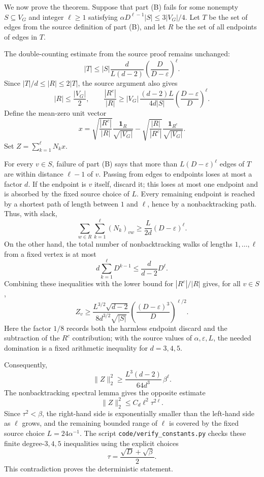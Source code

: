 \documentclass[11pt]{article}
\begin{document}
We now prove the theorem.  Suppose that part (B) fails for some nonempty
$S\subseteq V_G$ and integer $\ell\ge1$ satisfying
$\alpha D^{\ell-1}|S|\le 3|V_G|/4$.  Let $T$ be the set of edges from the
source definition of part (B), and let $R$ be the set of all endpoints of
edges in $T$.

The double-counting estimate from the source proof remains unchanged:
\[
  |T|\le |S|\frac{d}{L(d-2)}
  \left(\frac{D}{D-\varepsilon}\right)^\ell .
\]
Since $|T|/d\le |R|\le2|T|$, the source argument also gives
\[
  |R|\le \frac{|V_G|}{2},\qquad
  \frac{|R^c|}{|R|}
  \ge |V_G|\,\frac{(d-2)L}{4d|S|}
  \left(\frac{D-\varepsilon}{D}\right)^\ell .
\]
Define the mean-zero unit vector
\[
  x=\sqrt{\frac{|R^c|}{|R|}}\frac{\mathbf 1_R}{\sqrt{|V_G|}}
  -\sqrt{\frac{|R|}{|R^c|}}\frac{\mathbf 1_{R^c}}{\sqrt{|V_G|}} .
\]
Set $Z=\sum_{k=1}^{\ell}N_kx$.

For every $v\in S$, failure of part (B) says that more than
$L(D-\varepsilon)^\ell$ edges of $T$ are within distance $\ell-1$ of $v$.
Passing from edges to endpoints loses at most a factor $d$.  If the endpoint
is $v$ itself, discard it; this loses at most one endpoint and is absorbed by
the fixed source choice of $L$.  Every remaining endpoint is reached by a
shortest path of length between $1$ and $\ell$, hence by a nonbacktracking
path.  Thus, with slack,
\[
  \sum_{w\in R}\sum_{k=1}^{\ell}(N_k)_{vw}
  \ge \frac{L}{2d}(D-\varepsilon)^\ell .
\]
On the other hand, the total number of nonbacktracking walks of lengths
$1,\ldots,\ell$ from a fixed vertex is at most
\[
  d\sum_{k=1}^{\ell}D^{k-1}\le \frac{d}{d-2}D^\ell .
\]
Combining these inequalities with the lower bound for $|R^c|/|R|$ gives,
for all $v\in S$,
\[
  Z_v\ge
  \frac{L^{3/2}\sqrt{d-2}}{8d^{3/2}\sqrt{|S|}}
  \left(\frac{(D-\varepsilon)^3}{D}\right)^{\ell/2}.
\]
Here the factor $1/8$ records both the harmless endpoint discard and the
subtraction of the $R^c$ contribution; with the source values of
$\alpha,\varepsilon,L$, the needed domination is a fixed arithmetic
inequality for $d=3,4,5$.

Consequently,
\[
  \|Z\|_2^2
  \ge
  \frac{L^3(d-2)}{64d^3}\,\beta^\ell .
\]
The nonbacktracking spectral lemma gives the opposite estimate
\[
  \|Z\|_2^2\le C_d\ell^2\tau^{2\ell}.
\]
Since $\tau^2<\beta$, the right-hand side is exponentially smaller than the
left-hand side as $\ell$ grows, and the remaining bounded range of $\ell$ is
covered by the fixed source choice $L=24\alpha^{-1}$.  The script
\texttt{code/verify\_constants.py} checks these finite degree-$3,4,5$
inequalities using the explicit choices
\[
  \tau=\frac{\sqrt D+\sqrt\beta}{2}.
\]
This contradiction proves the deterministic statement.
\end{document}
